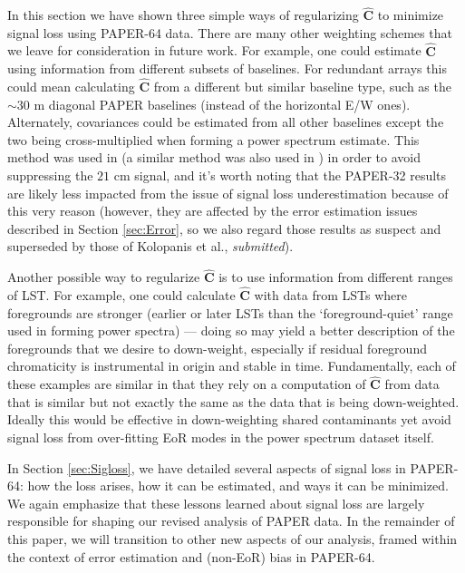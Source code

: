 \documentclass[preprint2,numberedappendix,tighten]{aastex6}  %
\begin{document}
In this section we have shown three simple ways of regularizing $\widehat{\textbf{C}}$ to minimize signal loss using PAPER-64 
data. There are many other weighting schemes that we leave for consideration in future work. For example, one could estimate 
$\widehat{\textbf{C}}$ using information from different subsets of baselines. For redundant arrays this could mean calculating $
\widehat{\textbf{C}}$ from a different but similar baseline type, such as the $\sim30$ m diagonal PAPER baselines (instead of the 
horizontal E/W ones). Alternately, covariances could be estimated from all other baselines except the two being cross-multiplied 
when forming a power spectrum estimate. This method was used in \citet{parsons_et_al2014} (a similar method was also used in \citet{dillon_et_al2015}) in order to avoid suppressing the 
$21$ cm signal, and it's worth noting that the PAPER-32 results are likely less impacted from the issue of signal loss underestimation 
because of this very reason (however, they are affected by the error estimation issues described in Section \ref{sec:Error}, so 
we also regard those results as suspect and superseded by those of Kolopanis et al., \textit{submitted}).

Another possible way to regularize $\widehat{\textbf{C}}$ is to use information from different ranges of LST. For example, one could 
calculate $\widehat{\textbf{C}}$ with data from LSTs where foregrounds are stronger (earlier or later LSTs than the `foreground-quiet' range used in forming power spectra) --- doing so may yield a better description of the foregrounds that we desire to 
down-weight, especially if residual foreground chromaticity is instrumental in origin and stable in time. Fundamentally, each of these examples are similar in that they rely on a computation of $\widehat{\textbf{C}}$ from 
data that is similar but not exactly the same as the data that is being down-weighted. Ideally this would be effective in down-weighting shared contaminants yet avoid signal loss from over-fitting EoR modes in the power spectrum dataset itself. 

In Section \ref{sec:Sigloss}, we have detailed several aspects of signal loss in PAPER-64: how the loss arises, how it can be estimated, and ways it can be minimized. We again emphasize that these lessons learned about signal loss are largely responsible for shaping our revised analysis of PAPER data. In the remainder of this paper, we will transition to other new aspects of our analysis, framed within the context of error estimation and (non-EoR) bias in PAPER-64.
\end{document}
